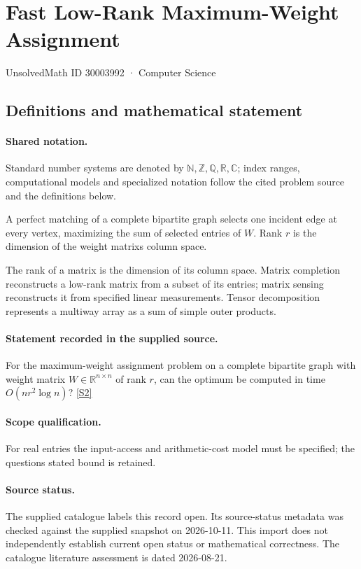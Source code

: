 \documentclass[11pt]{article}
\newcommand{\sref}[2]{\hyperlink{source:#1:#2}{[S#2]}}
\begin{document}
\setcounter{section}{30003991}
\section{Fast Low-Rank Maximum-Weight Assignment}\label{30003992}
{\small\sffamily UnsolvedMath ID 30003992 · Computer Science}
\subsection{Definitions and mathematical statement}

\paragraph{Shared notation.}Standard number systems are denoted by $\mathbb N,\mathbb Z,\mathbb Q,\mathbb R,\mathbb C$; index ranges, computational models and specialized notation follow the cited problem source and the definitions below.


A perfect matching of a complete bipartite graph selects one incident edge at every vertex, maximizing the sum of selected entries of $W$. Rank $r$ is the dimension of the weight matrix\textquotesingle s column space.

The rank of a matrix is the dimension of its column space. Matrix completion reconstructs a low-rank matrix from a subset of its entries; matrix sensing reconstructs it from specified linear measurements. Tensor decomposition represents a multiway array as a sum of simple outer products.
\paragraph{Statement recorded in the supplied source.}
For the maximum-weight assignment problem on a complete bipartite graph with weight matrix $W\in\mathbb R^{n\times n}$ of rank $r$, can the optimum be computed in time $O(nr^2\log n)$? \sref{30003992}{2}
\paragraph{Scope qualification.}
For real entries the input-access and arithmetic-cost model must be specified; the question\textquotesingle s stated bound is retained.
\paragraph{Source status.}
The supplied catalogue labels this record open. Its source-status metadata was checked against the supplied snapshot on 2026-10-11. This import does not independently establish current open status or mathematical correctness. The catalogue literature assessment is dated 2026-08-21.
\end{document}
